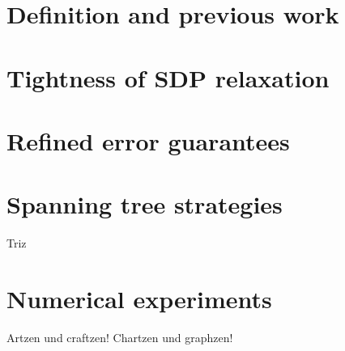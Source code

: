 \label{ch:ang_sync}
\section{Definition and previous work}


\section{Tightness of SDP relaxation}
\label{sec:ang_sync_sdp}


\section{Refined error guarantees}
\label{sec:ang_sync_improve}


\section{Spanning tree strategies}
\label{sec:ang_sync_tree}
Triz
%

\section{Numerical experiments}
\label{sec:ang_sync_num}
Artzen und craftzen!  Chartzen und graphzen!
